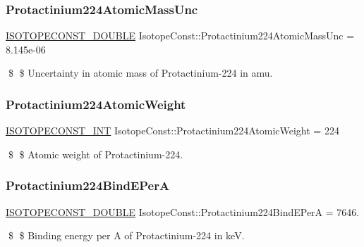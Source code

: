 \subsubsection{\texorpdfstring{Protactinium224\+Atomic\+Mass\+Unc}{Protactinium224AtomicMassUnc}}
{\footnotesize\ttfamily \mbox{\hyperlink{group___isotope_const-_macros_ga8f45a7272ce02c0b4c65c44636ed719a}{I\+S\+O\+T\+O\+P\+E\+C\+O\+N\+S\+T\+\_\+\+D\+O\+U\+B\+LE}} Isotope\+Const\+::\+Protactinium224\+Atomic\+Mass\+Unc = 8.\+145e-\/06}

\$ \$ Uncertainty in atomic mass of Protactinium-\/224 in amu. \mbox{\label{group___isotope_const-_protactinium-_pa224_ga0c10a5d0a412dea5ad5da00bb7cd7630}} 
\subsubsection{\texorpdfstring{Protactinium224\+Atomic\+Weight}{Protactinium224AtomicWeight}}
{\footnotesize\ttfamily \mbox{\hyperlink{group___isotope_const-_macros_ga5f18360b3e99483a35c32d789e62621c}{I\+S\+O\+T\+O\+P\+E\+C\+O\+N\+S\+T\+\_\+\+I\+NT}} Isotope\+Const\+::\+Protactinium224\+Atomic\+Weight = 224}

\$ \$ Atomic weight of Protactinium-\/224. \mbox{\label{group___isotope_const-_protactinium-_pa224_gab17eda5db51bb863b7788a6dac5e577f}} 
\subsubsection{\texorpdfstring{Protactinium224\+Bind\+E\+PerA}{Protactinium224BindEPerA}}
{\footnotesize\ttfamily \mbox{\hyperlink{group___isotope_const-_macros_ga8f45a7272ce02c0b4c65c44636ed719a}{I\+S\+O\+T\+O\+P\+E\+C\+O\+N\+S\+T\+\_\+\+D\+O\+U\+B\+LE}} Isotope\+Const\+::\+Protactinium224\+Bind\+E\+PerA = 7646.}

\$ \$ Binding energy per A of Protactinium-\/224 in keV. \mbox{\label{group___isotope_const-_protactinium-_pa224_ga06991970dc4fa0eef825dc75346f8eb4}} 
